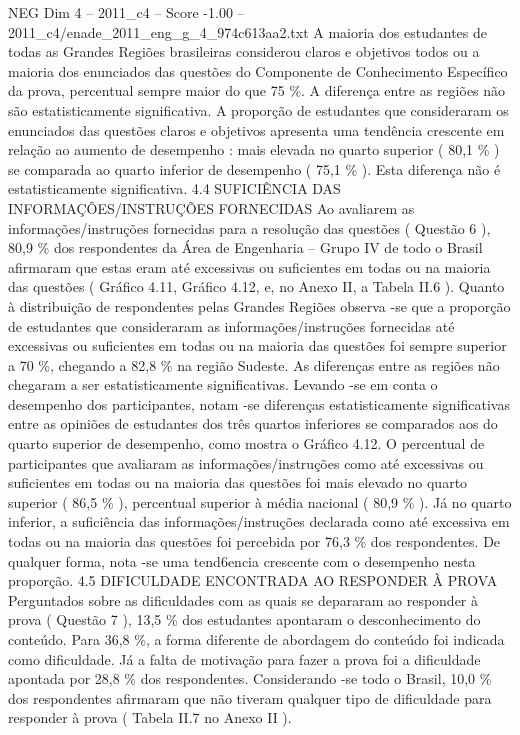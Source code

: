 \begin{textsample}{NEG Dim 4 – 2011\_c4 – Score -1.00 – 2011\_c4/enade\_2011\_eng\_g\_4\_974c613aa2.txt}
A maioria dos estudantes de todas as Grandes Regiões brasileiras considerou claros e objetivos todos ou a maioria dos enunciados das questões do Componente de Conhecimento Específico da prova, percentual sempre maior do que 75 \%.
A diferença entre as regiões não são estatisticamente significativa.
A proporção de estudantes que consideraram os enunciados das questões claros e objetivos apresenta uma tendência crescente em relação ao aumento de desempenho : mais elevada no quarto superior ( 80,1 \% ) se comparada ao quarto inferior de desempenho ( 75,1 \% ).
Esta diferença não é estatisticamente significativa. 4.4 SUFICIÊNCIA DAS INFORMAÇÕES/INSTRUÇÕES FORNECIDAS Ao avaliarem as informações/instruções fornecidas para a resolução das questões ( Questão 6 ), 80,9 \% dos respondentes da Área de Engenharia – Grupo IV de todo o Brasil afirmaram que estas eram até excessivas ou suficientes em todas ou na maioria das questões ( Gráfico 4.11, Gráfico 4.12, e, no Anexo II, a Tabela II.6 ).
Quanto à distribuição de respondentes pelas Grandes Regiões observa -se que a proporção de estudantes que consideraram as informações/instruções fornecidas até excessivas ou suficientes em todas ou na maioria das questões foi sempre superior a 70 \%, chegando a 82,8 \% na região Sudeste.
As diferenças entre as regiões não chegaram a ser estatisticamente significativas.
Levando -se em conta o desempenho dos participantes, notam -se diferenças estatisticamente significativas entre as opiniões de estudantes dos três quartos inferiores se comparados aos do quarto superior de desempenho, como mostra o Gráfico 4.12.
O percentual de participantes que avaliaram as informações/instruções como até excessivas ou suficientes em todas ou na maioria das questões foi mais elevado no quarto superior ( 86,5 \% ), percentual superior à média nacional ( 80,9 \% ).
Já no quarto inferior, a suficiência das informações/instruções declarada como até excessiva em todas ou na maioria das questões foi percebida por 76,3 \% dos respondentes.
De qualquer forma, nota -se uma tend6encia crescente com o desempenho nesta proporção. 4.5 DIFICULDADE ENCONTRADA AO RESPONDER À PROVA Perguntados sobre as dificuldades com as quais se depararam ao responder à prova ( Questão 7 ), 13,5 \% dos estudantes apontaram o desconhecimento do conteúdo.
Para 36,8 \%, a forma diferente de abordagem do conteúdo foi indicada como dificuldade.
Já a falta de motivação para fazer a prova foi a dificuldade apontada por 28,8 \% dos respondentes.
Considerando -se todo o Brasil, 10,0 \% dos respondentes afirmaram que não tiveram qualquer tipo de dificuldade para responder à prova ( Tabela II.7 no Anexo II ).

\end{textsample}
